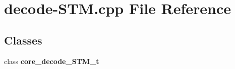 \section{decode-STM.cpp File Reference}
\label{decode-STM_8cpp}
\subsection*{Classes}
\begin{CompactItemize}
\item 
class {\bf core\_\-decode\_\-STM\_\-t}
\end{CompactItemize}
